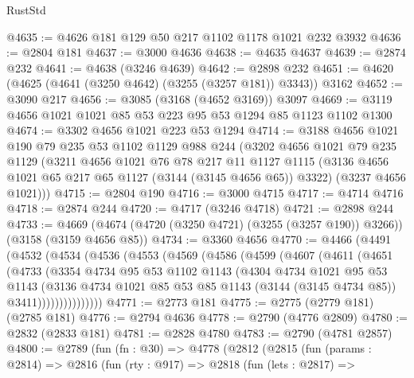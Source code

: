 \begin{lexlean}{RustStd}
\begin{coremodule}
@4635 := @4626 @181 @129 @50 @217 @1102 @1178 @1021 @232 @3932
@4636 := @2804 @181
@4637 := @3000 @4636
@4638 := @4635 @4637
@4639 := @2874 @232
@4641 := @4638 (@3246 @4639)
@4642 := @2898 @232
@4651 := @4620 (@4625 (@4641 (@3250 @4642) (@3255 (@3257 @181)) @3343)) @3162
@4652 := @3090 @217
@4656 := @3085 (@3168 (@4652 @3169)) @3097
@4669 := @3119 @4656 @1021 @1021 @85 @53 @223 @95 @53 @1294 @85 @1123 @1102 @1300
@4674 := @3302 @4656 @1021 @223 @53 @1294
@4714 := @3188
    @4656
    @1021
    @190
    @79
    @235
    @53
    @1102
    @1129
    @988
    @244
    (@3202
      @4656
      @1021
      @79
      @235
      @1129
      (@3211
        @4656
        @1021
        @76
        @78
        @217
        @11
        @1127
        @1115
        (@3136 @4656 @1021 @65 @217 @65 @1127 (@3144 (@3145 @4656 @65)) @3322)
        (@3237 @4656 @1021)))
@4715 := @2804 @190
@4716 := @3000 @4715
@4717 := @4714 @4716
@4718 := @2874 @244
@4720 := @4717 (@3246 @4718)
@4721 := @2898 @244
@4733 := @4669 (@4674 (@4720 (@3250 @4721) (@3255 (@3257 @190)) @3266)) (@3158 (@3159 @4656 @85))
@4734 := @3360 @4656
@4770 := @4466
    (@4491
      (@4532
        (@4534
          (@4536
            (@4553
              (@4569
                (@4586
                  (@4599
                    (@4607
                      (@4611
                        (@4651
                          (@4733
                            (@3354
                              @4734
                              @95
                              @53
                              @1102
                              @1143
                              (@4304
                                @4734
                                @1021
                                @95
                                @53
                                @1143
                                (@3136
                                  @4734
                                  @1021
                                  @85
                                  @53
                                  @85
                                  @1143
                                  (@3144 (@3145 @4734 @85))
                                  @3411)))))))))))))))
@4771 := @2773 @181
@4775 := @2775 (@2779 @181) (@2785 @181)
@4776 := @2794 @4636
@4778 := @2790 (@4776 @2809)
@4780 := @2832 (@2833 @181)
@4781 := @2828 @4780
@4783 := @2790 (@4781 @2857)
@4800 := @2789
    (fun (fn : @30) =>
    @4778
      (@2812
        (@2815
          (fun (params : @2814) =>
          @2816
            (fun (rty : @917) =>
            @2818
              (fun (lets : @2817) =>

\end{coremodule}
\end{lexlean}
